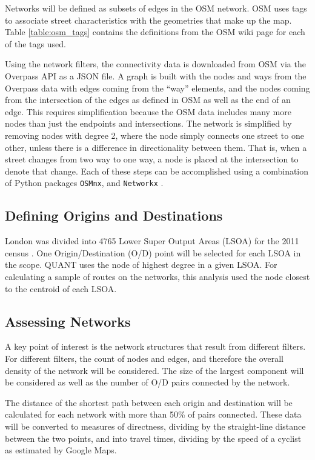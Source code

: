 Networks will be defined as subsets of edges in the OSM network. OSM uses tags to associate street characteristics with the geometries that make up the map. Table \ref{table:osm_tags} contains the definitions from the OSM wiki page for each of the tags used.  

Using the network filters, the connectivity data is downloaded from OSM via the Overpass API as a JSON file. A graph is built with the nodes and ways from the Overpass data with edges coming from the ``way'' elements, and the nodes coming from the intersection of the edges as defined in OSM as well as the end of an edge. This requires simplification because the OSM data includes many more nodes than just the endpoints and intersections. The network is simplified by removing nodes with degree 2, where the node simply connects one street to one other, unless there is a difference in directionality between them. That is, when a street changes from two way to one way, a node is placed at the intersection to denote that change.  Each of these steps can be accomplished using a combination of Python packages \texttt{OSMnx}, \parencite{osmnx} and \texttt{Networkx} \parencite{networkx}.

\subsection{Defining Origins and Destinations}

London was divided into 4765 Lower Super Output Areas (LSOA) for the 2011 census \parencite{lsoa}. One Origin/Destination (O/D) point will be selected for each LSOA in the scope. QUANT uses the node of highest degree in a given LSOA. For calculating a sample of routes on the networks, this analysis used the node closest to the centroid of each LSOA. 

\subsection{Assessing Networks}

A key point of interest is the network structures that result from different filters. For different filters, the count of nodes and edges, and therefore the overall density of the network will be considered. The size of the largest component will be considered as well as the number of O/D pairs connected by the network. 

The distance of the shortest path between each origin and destination will be calculated for each network with more than 50\% of pairs connected. These data will be converted to measures of directness, dividing by the straight-line distance between the two points, and into travel times, dividing by the speed of a cyclist as estimated by Google Maps. 

